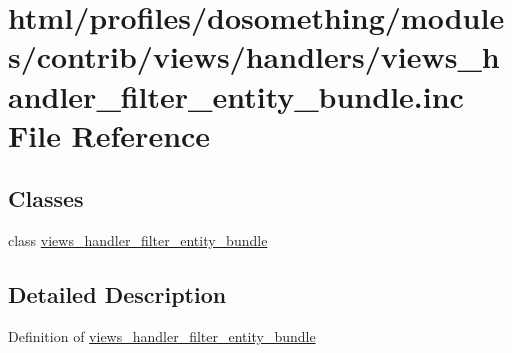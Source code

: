 \hypertarget{views__handler__filter__entity__bundle_8inc}{
\section{html/profiles/dosomething/modules/contrib/views/handlers/views\_\-handler\_\-filter\_\-entity\_\-bundle.inc File Reference}
\label{views__handler__filter__entity__bundle_8inc}
}
\subsection*{Classes}
\begin{DoxyCompactItemize}
\item 
class \hyperlink{classviews__handler__filter__entity__bundle}{views\_\-handler\_\-filter\_\-entity\_\-bundle}
\end{DoxyCompactItemize}


\subsection{Detailed Description}
Definition of \hyperlink{classviews__handler__filter__entity__bundle}{views\_\-handler\_\-filter\_\-entity\_\-bundle} 